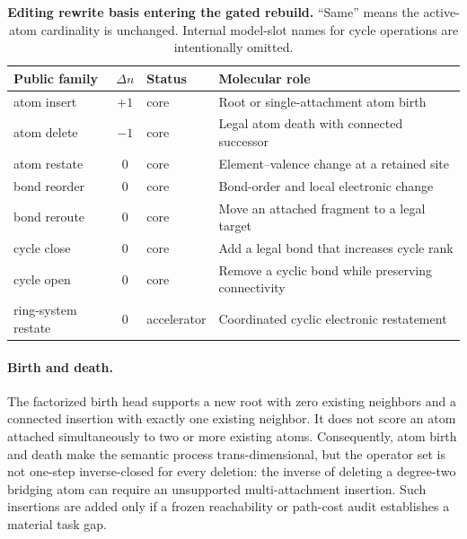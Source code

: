 \begin{table}[t]
  \centering
  \caption{\textbf{Editing rewrite basis entering the gated rebuild.}
  ``Same'' means the active-atom cardinality is unchanged. Internal model-slot
  names for cycle operations are intentionally omitted.}
  \label{tab:operators}
  \small
  \begin{tabularx}{\linewidth}{@{}lclX@{}}
    \toprule
    Public family & $\Delta n$ & Status & Molecular role \\
    \midrule
    atom insert & $+1$ & core & Root or single-attachment atom birth \\
    atom delete & $-1$ & core & Legal atom death with connected successor \\
    atom restate & $0$ & core & Element--valence change at a retained site \\
    bond reorder & $0$ & core & Bond-order and local electronic change \\
    bond reroute & $0$ & core & Move an attached fragment to a legal target \\
    cycle close & $0$ & core & Add a legal bond that increases cycle rank \\
    cycle open & $0$ & core & Remove a cyclic bond while preserving connectivity \\
    ring-system restate & $0$ & accelerator & Coordinated cyclic electronic restatement \\
    \bottomrule
  \end{tabularx}
\end{table}

\paragraph{Birth and death.}
The factorized birth head supports a new root with zero existing neighbors and
a connected insertion with exactly one existing neighbor. It does not score an
atom attached simultaneously to two or more existing atoms. Consequently,
atom birth and death make the semantic process trans-dimensional, but the
operator set is not one-step inverse-closed for every deletion: the inverse of
deleting a degree-two bridging atom can require an unsupported multi-attachment
insertion. Such insertions are added only if a frozen reachability or path-cost
audit establishes a material task gap.

